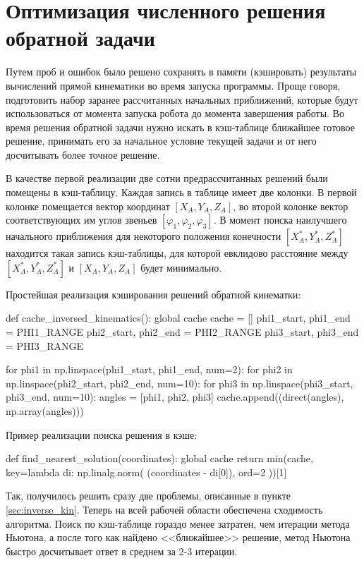 \section{Оптимизация численного решения обратной задачи}

Путем проб и ошибок было решено сохранять в памяти (кэшировать) результаты вычислений прямой кинематики во время запуска программы. Проще говоря, подготовить набор заранее рассчитанных начальных приближений, которые будут использоваться от момента запуска робота до момента завершения работы. Во время решения обратной задачи нужно искать в кэш-таблице ближайшее готовое решение, принимать его за начальное условие текущей задачи и от него досчитывать более точное решение.

В качестве первой реализации две сотни предрассчитанных решений были помещены в кэш-таблицу. Каждая запись в таблице имеет две колонки. В первой колонке помещается вектор координат $ [X_A,Y_A,Z_A] $, во второй колонке вектор соответствующих им углов звеньев $ [\varphi_1, \varphi_2, \varphi_3] $. В момент поиска наилучшего начального приближения для некоторого положения конечности $ [X_A^*,Y_A^*,Z_A^*] $ находится такая запись кэш-таблицы, для которой евклидово расстояние между $ [X_A^*,Y_A^*,Z_A^*] $ и $ [X_A,Y_A,Z_A] $ будет минимально. 

\noindent Простейшая реализация кэширования решений обратной кинематки:

\begin{python}
def cache_inversed_kinematics():
    global cache
    cache = []
    phi1_start, phi1_end = PHI1_RANGE
    phi2_start, phi2_end = PHI2_RANGE
    phi3_start, phi3_end = PHI3_RANGE
    
    for phi1 in np.linspace(phi1_start, phi1_end, num=2):
        for phi2 in np.linspace(phi2_start, phi2_end, num=10):
            for phi3 in np.linspace(phi3_start, phi3_end, num=10):
                angles = [phi1, phi2, phi3]
                cache.append((direct(angles), np.array(angles)))
\end{python}

\noindent Пример реализации поиска решения в кэше:

\begin{python}
def find_nearest_solution(coordinates):
    global cache
    return min(cache, key=lambda di: np.linalg.norm(
        (coordinates - di[0]), 
        ord=2
    ))[1]
\end{python}

Так, получилось решить сразу две проблемы, описанные в пункте \ref{sec:inverse_kin}. Теперь на всей рабочей области обеспечена сходимость алгоритма. Поиск по кэш-таблице гораздо менее затратен, чем итерации метода Ньютона, а после того как найдено <<ближайшее>> решение, метод Ньютона быстро досчитывает ответ в среднем за 2-3 итерации.


